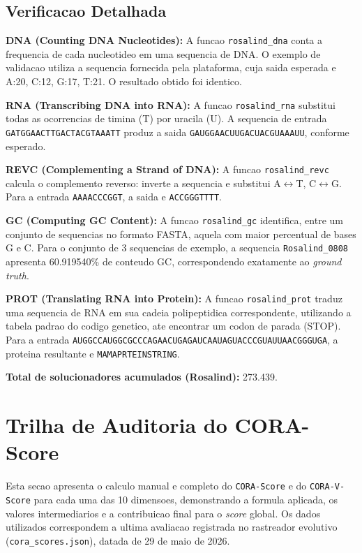 \subsection{Verificacao Detalhada}

\textbf{DNA (Counting DNA Nucleotides):} A funcao \texttt{rosalind\_dna} conta a frequencia de cada nucleotideo em uma sequencia de DNA. O exemplo de validacao utiliza a sequencia fornecida pela plataforma, cuja saida esperada e A:20, C:12, G:17, T:21. O resultado obtido foi identico.

\textbf{RNA (Transcribing DNA into RNA):} A funcao \texttt{rosalind\_rna} substitui todas as ocorrencias de timina (T) por uracila (U). A sequencia de entrada \texttt{GATGGAACTTGACTACGTAAATT} produz a saida \texttt{GAUGGAACUUGACUACGUAAAUU}, conforme esperado.

\textbf{REVC (Complementing a Strand of DNA):} A funcao \texttt{rosalind\_revc} calcula o complemento reverso: inverte a sequencia e substitui A$\leftrightarrow$T, C$\leftrightarrow$G. Para a entrada \texttt{AAAACCCGGT}, a saida e \texttt{ACCGGGTTTT}.

\textbf{GC (Computing GC Content):} A funcao \texttt{rosalind\_gc} identifica, entre um conjunto de sequencias no formato FASTA, aquela com maior percentual de bases G e C. Para o conjunto de 3 sequencias de exemplo, a sequencia \texttt{Rosalind\_0808} apresenta 60.919540\% de conteudo GC, correspondendo exatamente ao \textit{ground truth}.

\textbf{PROT (Translating RNA into Protein):} A funcao \texttt{rosalind\_prot} traduz uma sequencia de RNA em sua cadeia polipeptidica correspondente, utilizando a tabela padrao do codigo genetico, ate encontrar um codon de parada (STOP). Para a entrada \texttt{AUGGCCAUGGCGCCCAGAACUGAGAUCAAUAGUACCCGUAUUAACGGGUGA}, a proteina resultante e \texttt{MAMAPRTEINSTRING}.

\textbf{Total de solucionadores acumulados (Rosalind):} 273.439.

\newpage

\section{Trilha de Auditoria do CORA-Score}

Esta secao apresenta o calculo manual e completo do \texttt{CORA-Score} e do \texttt{CORA-V-Score} para cada uma das 10 dimensoes, demonstrando a formula aplicada, os valores intermediarios e a contribuicao final para o \textit{score} global. Os dados utilizados correspondem a ultima avaliacao registrada no rastreador evolutivo (\texttt{cora\_scores.json}), datada de 29 de maio de 2026.

